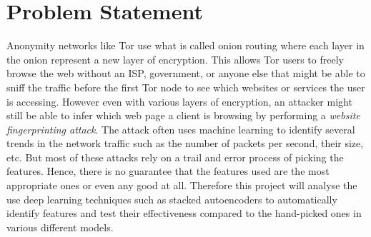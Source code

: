 \documentclass[10pt,a4paper]{article}
\begin{document}


\section{Problem Statement}
Anonymity networks like Tor use what is called onion routing where each layer in the onion represent a new layer of encryption.
This allows Tor users to freely browse the web without an ISP, government, or anyone else that might be able to sniff the traffic before the first Tor node to see which websites or services the user is accessing.
However even with various layers of encryption, an attacker might still be able to infer which web page a client is browsing by performing a \textit{website fingerprinting attack}.
The attack often uses machine learning to identify several trends in the network traffic such as the number of packets per second, their size, etc.
But most of these attacks rely on a trail and error process of picking the features.
Hence, there is no guarantee that the features used are the most appropriate ones or even any good at all.
Therefore this project will analyse the use deep learning techniques such as stacked autoencoders to automatically identify features and test their effectiveness compared to the hand-picked ones in various different models.
\end{document}
